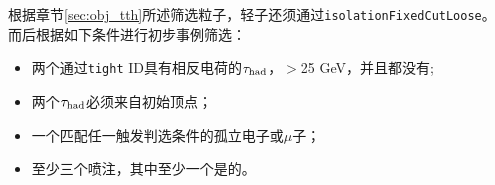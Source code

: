 根据章节\ref{sec:obj_tth}所述筛选粒子，轻子还须通过\texttt{isolationFixedCutLoose}。
而后根据如下条件进行初步事例筛选：
\begin{itemize}
  \item 两个通过\texttt{tight} ID具有相反电荷的$\tau_{\text{had}}$，\pt$>$25 GeV，并且都没有\btagged;
  \item 两个$\tau_{\text{had}}$必须来自初始顶点；
  \item 一个匹配任一触发判选条件的孤立电子或$\mu$子；
  \item 至少三个喷注，其中至少一个是\btagged 的。
\end{itemize}

